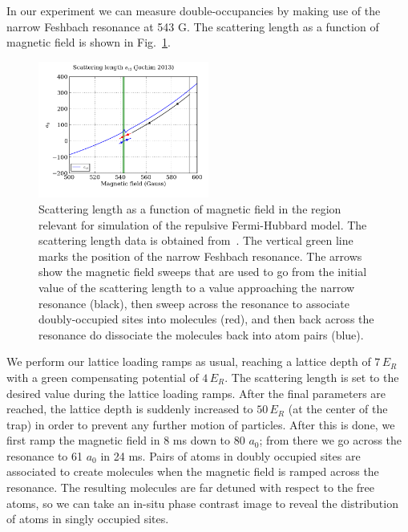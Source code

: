 \documentclass[11pt,letter]{article}
\begin{document}
In our experiment we can measure double-occupancies by making use of the narrow
Feshbach resonance at 543 G.  The scattering length as a function of magnetic
field is shown in Fig.~\ref{fig:scattlen_bfield}.
\begin{figure} \centering
\includegraphics[width=0.5\textwidth]{../2_Data/ajochim_plot.png}
\caption[Scattering length as a function of magnetic field]{\small
Scattering length as a function of magnetic field in the region relevant for
simulation of the repulsive Fermi-Hubbard model.   The scattering length data
is obtained from~\cite{Zurn2013}.  The vertical green line marks the position
of the narrow Feshbach resonance.   The arrows show the magnetic field sweeps
that are used to go from the initial value of the scattering length to a value
approaching the narrow resonance (black), then sweep across the resonance to
associate doubly-occupied sites into molecules (red), and then back across the
resonance do dissociate the molecules back into atom pairs (blue).    
} \label{fig:scattlen_bfield} 
\end{figure}
We perform our lattice loading ramps as usual, reaching a lattice depth of
$7\,E_{R}$ with a green compensating potential of $4\,E_{R}$.  The scattering
length is set to the desired value during the lattice loading ramps.   After
the final parameters are reached, the lattice depth is suddenly increased to
$50\,E_{R}$ (at the center of the trap) in order to prevent any further motion of
particles.  After this is done, we first ramp the magnetic field in 8 ms down
to 80 $a_{0}$; from there we go across the resonance to 61 $a_{0}$ in
24 ms.  Pairs of atoms in doubly occupied sites are associated to create
molecules when the magnetic field is ramped across the resonance.  The
resulting molecules are far detuned with respect to the free atoms,
so we can take an in-situ phase contrast image to reveal the distribution of
atoms in singly occupied sites.  
\end{document}
